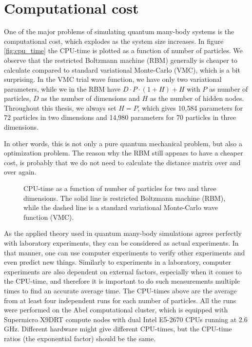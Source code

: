 \section{Computational cost}
One of the major problems of simulating quantum many-body systems is the computational cost, which explodes as the system size increases. In figure \eqref{fig:cpu_time} the CPU-time is plotted as a function of number of particles. We observe that the restricted Boltzmann machine (RBM) generally is cheaper to calculate compared to standard variational Monte-Carlo (VMC), which is a bit surprising. In the VMC trial wave function, we have only two variational parameters, while we in the RBM have $D\cdot P \cdot (1+H)+H$ with $P$ as number of particles, $D$ as the number of dimensions and $H$ as the number of hidden nodes. Throughout this thesis, we always set $H=P$, which gives 10,584 parameters for 72 particles in two dimensions and 14,980 parameters for 70 particles in three dimensions. 

In other words, this is not only a pure quantum mechanical problem, but also a optimization problem. The reason why the RBM still appears to have a cheaper cost, is probably that we do not need to calculate the distance matrix over and over again. 

\begin{figure} %
	\centering
	
	\label{fig:cpu_time}
	\caption{CPU-time as a function of number of particles for two and three dimensions. The solid line is restricted Boltzmann machine (RBM), while the dashed line is a standard variational Monte-Carlo wave function (VMC).}
\end{figure}

As the applied theory used in quantum many-body simulations agrees perfectly with laboratory experiments, they can be considered as actual experiments. In that manner, one can use computer experiments to verify other experiments and even predict new things. Similarly to experiments in a laboratory, computer experiments are also dependent on external factors, especially when it comes to the CPU-time, and therefore it is important to do such measurements multiple times to find an accurate average time. The CPU-times above are the average from at least four independent runs for each number of particles. All the runs were performed on the Abel computational cluster, which is equipped with Supermicro X9DRT compute nodes with dual Intel E5-2670 CPUs running at 2.6 GHz. Different hardware might give different CPU-times, but the CPU-time ratios (the exponential factor) should be the same. 


